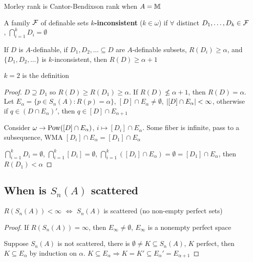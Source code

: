 \documentclass[11pt]{article}
\begin{document}
Morley rank is Cantor-Bendixson rank when \(A=\mathbb{M}\)

\begin{definition}[]
A family \(\mathcal{F}\) of definable sets \textbf{\(k\)-inconsistent} (\(k\in\omega\)) if \(\forall\)
distinct \(D_1,\dots,D_k\in\mathcal{F}\), \(\bigcap_{i=1}^k D_i=\emptyset\)
\end{definition}

\begin{lemma}[]
\label{5.5.4.12}
If \(D\) is \(A\)-definable, if \(D_1,D_2,\dots\subseteq D\) are \(A\)-definable subsets, \(R(D_i)\ge\alpha\),
and \(\{D_1,D_2,\dots\}\) is \(k\)-inconsistent, then \(R(D)\ge\alpha+1\)
\end{lemma}

\(k=2\) is the definition

\begin{proof}
\(D\supseteq D_1\) so \(R(D)\ge R(D_1)\ge\alpha\). If \(R(D)\not\le\alpha+1\), then \(R(D)=\alpha\).
Let \(E_\alpha=\{p\in S_n(A):R(p)=\alpha\}\), \([D]\cap E_\alpha\neq\emptyset\), \(\abs{[D]\cap E_\alpha}<\infty\), otherwise
if \(q\in(D\cap E_\alpha)'\), then \(q\in[D]\cap E_{\alpha+1}\)

Consider \(\omega\to\operatorname{Pow}([D]\cap E_\alpha)\), \(i\mapsto[D_i]\cap E_\alpha\). Some fiber is infinite, pass to a subsequence,
WMA \([D_i]\cap E_\alpha=[D_1]\cap E_\alpha\)

\(\bigcap_{i=1}^kD_i=\emptyset\), \(\bigcap_{i=1}^k[D_i]=\emptyset\), \(\bigcap_{i=1}^k([D_i]\cap E_\alpha)=\emptyset=[D_1]\cap E_\alpha\), then \(R(D_1)<\alpha\)
\end{proof}

\subsection{When is \texorpdfstring{\(S_n(A)\)}{S_n(A)} scattered}
\label{sec:org1bbf0a9}
\begin{proposition}[]
\(R(S_n(A))<\infty\) \(\Leftrightarrow\) \(S_n(A)\) is scattered (no non-empty perfect sets)
\end{proposition}

\begin{proof}
If \(R(S_n(A))=\infty\), then \(E_\infty\neq\emptyset\), \(E_\infty\) is a nonempty perfect space

Suppose \(S_n(A)\) is not scattered, there is \(\emptyset\neq K\subseteq S_n(A)\), \(K\) perfect,
then \(K\subseteq E_\alpha\) by induction on \(\alpha\). \(K\subseteq E_\alpha\Rightarrow K=K'\subseteq E_\alpha'=E_{\alpha+1}\)
\end{proof}
\end{document}

